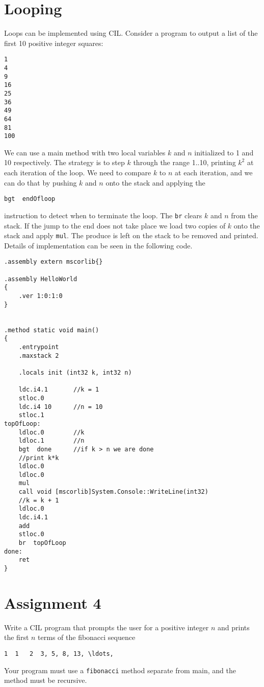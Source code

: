 \documentclass[10pt,a4paper]{amsart}
\begin{document}
\section{Looping}

Loops can be implemented using CIL. Consider a program to output a list of 
the first 10 positive integer squares:
\begin{verbatim}
1
4
9
16
25
36
49
64
81
100
\end{verbatim}

We can use a main method with two local variables $k$ and $n$
initialized to 1 and 10 respectively. The strategy is to step $k$
through the range 1..10, printing $k^2$ at each iteration of the loop.
We need to compare $k$ to $n$ at each iteration, and we can do that by
pushing $k$ and $n$ onto the stack and applying the 
\begin{verbatim}
bgt  endOfloop
\end{verbatim}
instruction to detect when to terminate the loop. The {\tt br}
clears $k$ and $n$ from the stack. If the jump to the end does not take place
we load  two 
copies of $k$ onto the stack and apply {\tt mul}. The produce is left on the 
stack to be removed and printed. Details of implementation can be seen
in the following code.
\begin{verbatim}
.assembly extern mscorlib{}

.assembly HelloWorld
{
    .ver 1:0:1:0
}


.method static void main()
{
    .entrypoint
    .maxstack 2
    
    .locals init (int32 k, int32 n)
                  
    ldc.i4.1       //k = 1
    stloc.0
    ldc.i4 10      //n = 10
    stloc.1    
topOfLoop:
    ldloc.0        //k
    ldloc.1        //n
    bgt  done      //if k > n we are done
    //print k*k
    ldloc.0
    ldloc.0
    mul
    call void [mscorlib]System.Console::WriteLine(int32)
    //k = k + 1
    ldloc.0
    ldc.i4.1
    add
    stloc.0
    br  topOfLoop
done:
    ret
}
\end{verbatim}


\section{Assignment 4}

Write a CIL program that prompts the user for a positive integer $n$ and prints the 
first $n$ terms of the fibonacci sequence
\begin{verbatim}
1  1   2  3, 5, 8, 13, \ldots,
\end{verbatim}
Your program must use a {\tt fibonacci} method separate from main, and the method must be 
recursive.
\end{document}
